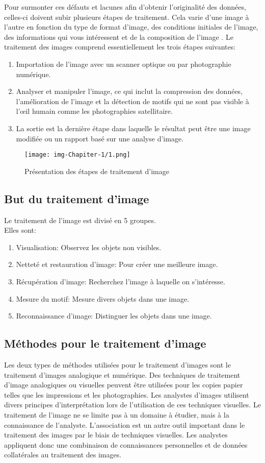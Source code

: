\documentclass[12pt]{article}
\begin{document}
Pour surmonter ces défauts et lacunes afin d'obtenir l'originalité des données, celles-ci doivent subir plusieurs étapes de traitement. Cela varie d'une image à l'autre en fonction du type de format d'image, des conditions initiales de l'image, des informations qui vous intéressent et de la composition de l'image \cite{14}.
Le traitement des images comprend essentiellement les trois étapes suivantes:
\begin{enumerate}
	\item Importation de l'image avec un scanner optique ou par photographie numérique.
	\item Analyser et manipuler l'image, ce qui inclut la compression des données, l'amélioration de l'image et la détection de motifs qui ne sont pas visible à l’œil humain comme les photographies satellitaire.
	\item La sortie est la dernière étape dans laquelle le résultat peut être une image modifiée ou un rapport basé sur une analyse d'image.
\end{enumerate}

\begin{figure}[h]
\centering
\texttt{[image: img-Chapiter-1/1.png]}
\caption{Présentation des étapes de traitement d’image}
\end{figure}

\subsection{But du traitement d'image}
Le traitement de l'image est divisé en 5 groupes.\\
Elles sont:
\begin{enumerate}
	\item Visualisation: Observez les objets non visibles.
	\item Netteté et restauration d'image: Pour créer une meilleure image.
	\item Récupération d'image: Recherchez l'image à laquelle on s’intéresse.
	\item Mesure du motif: Mesure divers objets dans une image.
	\item Reconnaissance d'image: Distinguer les objets dans une image.
\end{enumerate}
\subsection{Méthodes pour le traitement d’image}
Les deux types de méthodes utilisées pour le traitement d'images sont le traitement d'images analogique et numérique. Des techniques de traitement d'image analogiques ou visuelles peuvent être utilisées pour les copies papier telles que les impressions et les photographies. Les analystes d'images utilisent divers principes d'interprétation lors de l'utilisation de ces techniques visuelles. Le traitement de l'image ne se limite pas à un domaine à étudier, mais à la connaissance de l'analyste. L'association est un autre outil important dans le traitement des images par le biais de techniques visuelles. Les analystes appliquent donc une combinaison de connaissances personnelles et de données collatérales au traitement des images.
\end{document}
